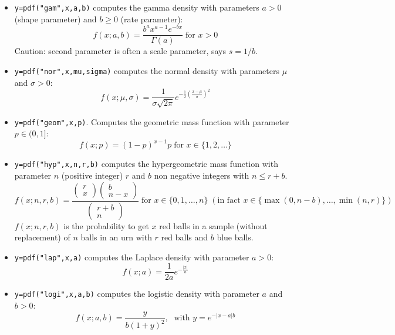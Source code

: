\begin{mandescription}
\begin{itemize}
\item {} \verb!y=pdf("gam",x,a,b)! computes the gamma
  density with parameters $a > 0$ (shape parameter) and $b \ge 0$
  (rate parameter):
$$
     f(x; a, b) = \frac{ b^a x^{a-1} e^{-bx} } {\Gamma(a)}\; \mbox{for } x > 0
$$
Caution: second parameter is often a scale parameter, says $s = 1/b$.

\item {} \verb!y=pdf("nor",x,mu,sigma)! computes the normal
  density with parameters $\mu$ and $\sigma > 0$:
$$
     f(x; \mu, \sigma) = \frac{ 1 }{ \sigma \sqrt{2\pi}}
     e^{-\frac{1}{2} \left( \frac{x-\mu}{\sigma} \right)^2 }
$$


\item {} \verb!y=pdf("geom",x,p)!. Computes
  the geometric mass function with parameter $p \in (0,1]$:
$$
     f(x; p) = (1-p)^{x-1} p \;\mbox{for } x \in \{1, 2, \dots\}
$$

\item {} \verb!y=pdf("hyp",x,n,r,b)! computes
  the hypergeometric mass function with parameter $n$ (positive
  integer) $r$ and $b$ non negative integers with $n \le r + b$. 
$$
     f(x; n, r,b) = 
    \frac{\left(\begin{array}{c}r\\x\end{array}\right)
          \left(\begin{array}{c}b\\n-x\end{array}\right)}
         {\left(\begin{array}{c}r+b\\n\end{array}\right)}
         \;\mbox{for } x \in \{0, 1, \dots, n\} \; (\mbox{in fact }x \in \{\max(0,n-b),\dots, \min(n,r)\})
$$
$f(x; n,r,b)$ is the probability to get $x$ red balls
in a sample (without replacement) of $n$ balls in an urn
with $r$ red balls and $b$ blue balls.


\item {} \verb!y=pdf("lap",x,a)! computes the Laplace
  density with parameter $a > 0$:
$$
     f(x; a) = \frac{1}{2a} e^{-\frac{|x|}{a}}
$$

\item {} \verb!y=pdf("logi",x,a,b)! computes the logistic
  density with parameter $a$ and $b > 0$:
$$
     f(x; a,b) = \frac{y}{b (1+y)^2}, \; \mbox{ with } y = e^{-{|x-a|}{b}}
$$



\end{itemize}
\end{mandescription}
